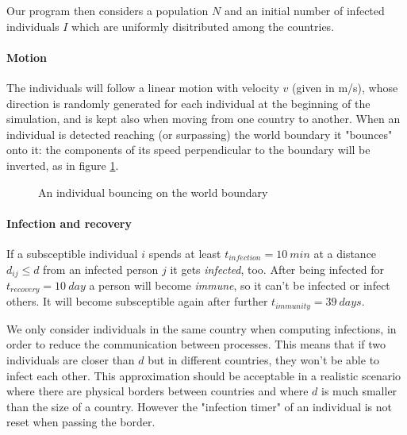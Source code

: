 \noindent
Our program then considers a population $N$ and an initial number of infected individuals $I$ which are uniformly disitributed among the countries. 

\paragraph{Motion}
The individuals will follow a linear motion with velocity $v$ (given in \si{m/s}), whose direction is randomly generated for each individual at the beginning of the simulation, and is kept also when moving from one country to another. When an individual is detected reaching (or surpassing) the world boundary it "bounces" onto it: the components of its speed perpendicular to the boundary will be inverted, as in figure \ref{fig:boundary_bounce}.

\begin{figure}[h]
    \centering
    \caption{An individual bouncing on the world boundary}
    \label{fig:boundary_bounce}
\end{figure}

\paragraph{Infection and recovery}
If a subsceptible individual $i$ spends at least $t_{infection} = \SI{10}{min}$ at a distance $d_{ij}\leq d$ from an infected person $j$ it gets \emph{infected}, too.
After being infected for $t_{recovery} = \SI{10}{day}$ a person will become \emph{immune}, so it can't be infected or infect others. It will become subsceptible again after further $t_{immunity} = \SI{39}{days}$.

We only consider individuals in the same country when computing infections, in order to reduce the communication between processes. This means that if two individuals are closer than $d$ but in different countries, they won't be able to infect each other. This approximation should be acceptable in a realistic scenario where there are physical borders between countries and where $d$ is much smaller than the size of a country. However the "infection timer" of an individual is not reset when passing the border.

